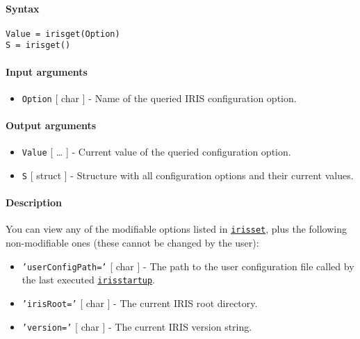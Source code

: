 


	\paragraph{Syntax}

\begin{verbatim}
Value = irisget(Option)
S = irisget()
\end{verbatim}

\paragraph{Input arguments}

\begin{itemize}
\itemsep1pt\parskip0pt
\item
  \texttt{Option} {[} char {]} - Name of the queried IRIS configuration
  option.
\end{itemize}

\paragraph{Output arguments}

\begin{itemize}
\item
  \texttt{Value} {[} \ldots{} {]} - Current value of the queried
  configuration option.
\item
  \texttt{S} {[} struct {]} - Structure with all configuration options
  and their current values.
\end{itemize}

\paragraph{Description}

You can view any of the modifiable options listed in
\href{config/irisset}{\texttt{irisset}}, plus the following
non-modifiable ones (these cannot be changed by the user):

\begin{itemize}
\item
  \texttt{'userConfigPath='} {[} char {]} - The path to the user
  configuration file called by the last executed
  \href{config/irisstartup}{\texttt{irisstartup}}.
\item
  \texttt{'irisRoot='} {[} char {]} - The current IRIS root directory.
\item
  \texttt{'version='} {[} char {]} - The current IRIS version string.
\end{itemize}

